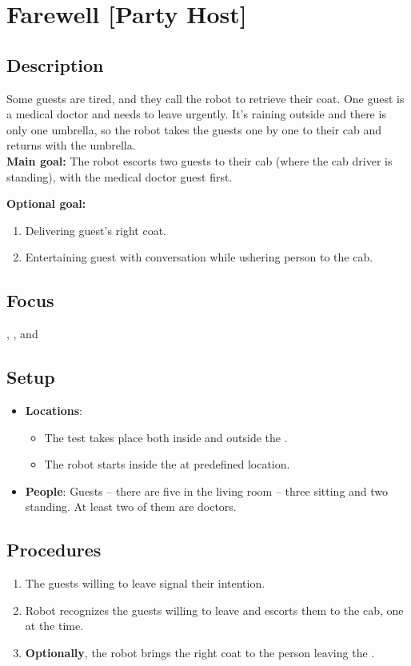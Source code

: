 \section{Farewell [Party Host]}
\label{test:farewell}

\subsection*{Description}
    Some guests are tired, and they call the robot to retrieve their coat. One guest is a medical doctor and needs to leave urgently. 
    It's raining outside and there is only one umbrella, so the robot takes the guests one by one to their cab and returns 
    with the umbrella.\\


\textbf{Main goal:}
The robot escorts two guests to their cab (where the cab driver is standing), with the medical doctor guest first.


\textbf{Optional goal:}
\begin{enumerate}[nosep]
	\item Delivering guest's right coat.
	\item Entertaining guest with conversation while ushering person to the cab.
\end{enumerate}

\subsection*{Focus}
\PerDet{}, \NAV{}, and \HRI{}

\subsection*{Setup}
\begin{itemize}
	\item \textbf{Locations}: 
		\begin{itemize}
		 \item The test takes place both inside and outside the \Arena{}.
		 \item The robot starts inside the \Arena{} at predefined location.
		\end{itemize}
	\item \textbf{People}: Guests -- there are five  in the living room -- three sitting and two standing. At least two of them are doctors.
\end{itemize}

\subsection*{Procedures}
\begin{enumerate}
	\item The guests willing to leave signal their intention.
	\item Robot recognizes the guests willing to leave and escorts them to the cab, one at the time.
	\item \textbf{Optionally}, the robot brings the right coat to the person leaving the \Arena{}.
\end{enumerate}

